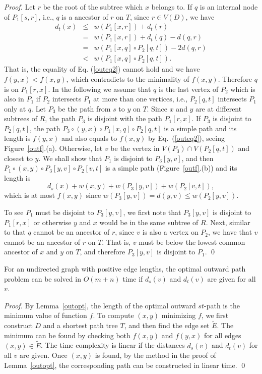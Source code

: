 \begin{proof}
Let $r$ be the root of the subtree which $x$ belongs to. If $q$ is an internal node of $P_1[s,r]$, i.e., $q$ is a ancestor of $r$ on $T$, since $r\in V(D)$, we have 
\begin{eqnarray*}
d_t(x)&\leq& w(P_1[x,r])+d_t(r)\\
&=&w(P_1[x,r])+d_t(q)-d(q,r)\\
&=&w(P_1[x,q]\circ P_2[q,t])-2d(q,r)\\
&<&w(P_1[x,q]\circ P_2[q,t]). 
\end{eqnarray*}
That is, the equality of Eq. (\ref{outeq2}) cannot hold and we have $f(y,x)<f(x,y)$, which contradicts to the minimality of $f(x,y)$.
Therefore $q$ is on $P_1[r,x]$.
In the following we assume that $q$ is the last vertex of $P_2$ which is also in $P_1$ if $P_2$ intersects $P_1$ at more than one vertices, i.e., $P_2[q,t]$ intersects $P_1$ only at $q$.
Let $P_3$ be the path from $s$ to $y$ on $T$. 
Since $x$ and $y$ are at different subtrees of $R$, the path $P_3$ is disjoint with the path $P_1[r,x]$. 
If $P_3$ is disjoint to $P_2[q,t]$, the path $P_3\circ (y,x)\circ P_1[x,q]\circ P_2[q,t]$ is a simple path and its length is $f(y,x)$ and also equals to $f(x,y)$ by Eq.~(\ref{outeq2}), seeing Figure~\ref{outf}.(a).
Otherwise, let $v$ be the vertex in $V(P_3)\cap V(P_2[q,t])$ and closest to $y$.
We shall show that $P_1$ is disjoint to $P_3[y,v]$, and then $P_1\circ (x,y)\circ P_3[y,v]\circ P_2[v,t]$ is a simple path (Figure~\ref{outf}.(b)) and its length is 
\[ d_s(x)+w(x,y)+w(P_3[y,v])+w(P_2[v,t]), \]
which is at most $f(x,y)$ since $w(P_3[y,v])=d(y,v)\leq w(P_2[y,v])$.

To see $P_1$ must be disjoint to $P_3[y,v]$, we first note that $P_3[y,v]$ is disjoint to $P_1[r,x]$ or otherwise $y$ and $x$ would be in the same subtree of $R$.
Next, similar to that $q$ cannot be an ancestor of $r$, since $v$ is also a vertex on $P_2$,  we have that $v$ cannot be an ancestor of $r$ on $T$. That is, $v$ must be below the lowest common ancestor of $x$ and $y$ on $T$, and therefore $P_3[y,v]$ is disjoint to $P_1$.  
\qed  
\end{proof}


\begin{theorem}\label{thm:out}
For an undirected graph with positive edge lengths, the optimal outward path problem can be solved in $O(m+n)$ time if $d_s(v)$ and $d_t(v)$ are given for all $v$.  
\end{theorem}
\begin{proof}
By Lemma~\ref{outopt}, the length of the optimal outward $st$-path is the minimum value of function $f$. To compute $(x,y)$ minimizing $f$, we first construct $D$ and a shortest path tree $T$, and then find the edge set $\widetilde{E}$. The minimum can be found by checking both $f(x,y)$ and $f(y,x)$ for all edges $(x,y)\in \widetilde{E}$. The time complexity is linear if the distances $d_s(v)$ and $d_t(v)$ for all $v$ are given.
Once $(x,y)$ is found, by the method in the proof of Lemma~\ref{outopt}, the corresponding path can be constructed in linear time.
\qed\end{proof}

